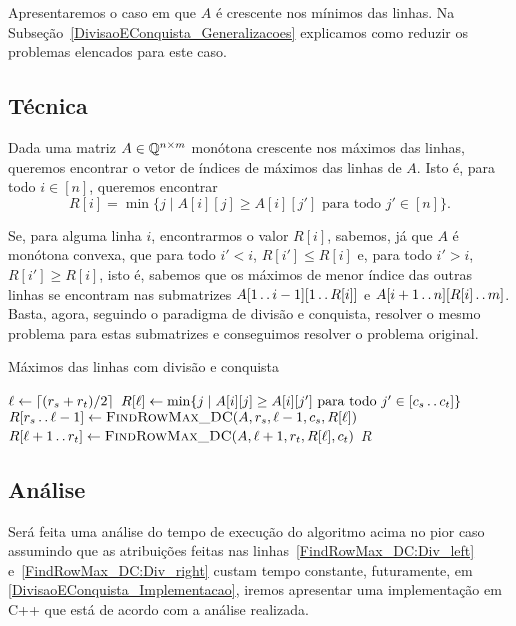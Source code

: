 Apresentaremos o caso em que $A$ é crescente nos mínimos das linhas. Na Subseção~\ref{DivisaoEConquista_Generalizacoes} explicamos como reduzir os problemas elencados para este caso.


\subsection{Técnica}
Dada uma matriz $A \in \mathbb{Q}^{n \times m}$ monótona crescente nos máximos das linhas, queremos encontrar o vetor de índices de máximos das linhas de $A$. Isto é, para todo $i \in [n]$, queremos encontrar
$$ R[i] = \min\{j \mid A[i][j] \geq A[i][j'] \text{ para todo } j' \in [n]\} \text{.}$$  

Se, para alguma linha $i$, encontrarmos o valor $R[i]$, sabemos, já que $A$ é monótona convexa, que para todo $i' < i$, $R[i'] \leq R[i]$ e, para todo $i' > i$, $R[i'] \geq R[i]$, isto é, sabemos que os máximos de menor índice das outras linhas se encontram nas submatrizes $A[1 \,.\,.\, i-1][1 \,.\,.\, R[i]]$ e $A[i+1 \,.\,.\, n][R[i] \,.\,.\, m]$. Basta, agora, seguindo o paradigma de divisão e conquista, resolver o mesmo problema para estas submatrizes e conseguimos resolver o problema original. 

\newcommand{\FRMDC}{\textsc{FindRowMax\_DC}}
\begin{algorithm}[H]
\caption{Máximos das linhas com divisão e conquista}
\label{FindRowMax_DC}
\begin{algorithmic}[1]
\Function{\FRMDC}{A, r_s, r_t, c_s, c_t}
    \State $\ell \leftarrow \lceil(r_s+r_t)/2\rceil$
    \State $R[\ell] \leftarrow \min\{j \mid A[i][j] \geq A[i][j'] \text{ para todo } j' \in [c_s \,.\,.\, c_t]\}$
        \State $R[r_s \tdots \ell-1] \rec \FRMDC(A, r_s, \ell-1, c_s, R[\ell])$ \label{FindRowMax_DC:Div_left}
    \EndIf
        \State $R[\ell+1 \tdots r_t] \rec \FRMDC(A, \ell+1, r_t, R[\ell], c_t)$ \label{FindRowMax_DC:Div_right}
    \EndIf
    \State \Return $R$
\EndFunction
\end{algorithmic}
\end{algorithm}

\subsection{Análise}
Será feita uma análise do tempo de execução do algoritmo acima no pior caso assumindo que as atribuições feitas nas linhas~\ref{FindRowMax_DC:Div_left} e~\ref{FindRowMax_DC:Div_right} custam tempo constante, futuramente, em \ref{DivisaoEConquista_Implementacao}, iremos apresentar uma implementação em C++ que está de acordo com a análise realizada.  

